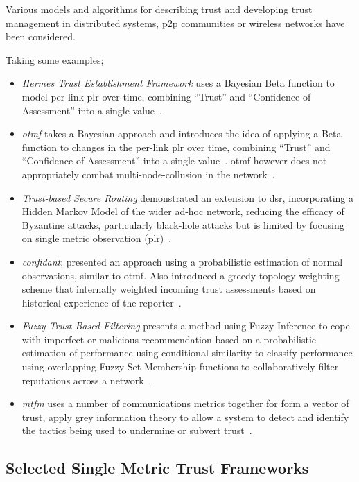\vspace{\baselineskip}

Various models and algorithms for describing trust and developing trust management in distributed systems, \gls{p2p} communities or wireless networks have been considered.

Taking some examples; %
%
\begin{itemize}
  \item \emph{Hermes Trust Establishment Framework} uses a Bayesian Beta function to model per-link \gls{plr} over time, combining ``Trust'' and ``Confidence of Assessment'' into a single value~\cite{Zouridaki2005}.
  \item \emph{\acrfull{otmf}} takes a Bayesian approach and introduces the idea of applying a Beta function to changes in the per-link \gls{plr} over time, combining ``Trust'' and ``Confidence of Assessment'' into a single value~\cite{Li2008}.
    \gls{otmf} however does not appropriately combat multi-node-collusion in the network~\cite{Cho2011}.
  \item \emph{Trust-based Secure Routing} demonstrated an extension to \gls{dsr}, incorporating a Hidden Markov Model of the wider ad-hoc network, reducing the efficacy of Byzantine attacks, particularly black-hole attacks but is limited by focusing on single metric observation (\gls{plr})~\cite{Moe2008a,Cho2011}.
  \item \emph{\gls{confidant}}; presented an approach using a probabilistic estimation of normal observations, similar to \gls{otmf}.
    Also introduced a greedy topology weighting scheme that internally weighted incoming trust assessments based on historical experience of the reporter~\cite{Buchegger2002}.
  \item \emph{Fuzzy Trust-Based Filtering} presents a method using Fuzzy Inference to cope with imperfect or malicious recommendation based on a probabilistic estimation of performance using conditional similarity to classify performance using overlapping Fuzzy Set Membership functions to collaboratively filter reputations across a network~\cite{Luo2008}.
  \item \emph{\acrfull{mtfm}} uses a number of communications metrics together for form a vector of trust, apply grey information theory to allow a system to detect and identify the tactics being used to undermine or subvert trust~\cite{Guo11}.
\end{itemize}
%

\subsection{Selected Single Metric Trust Frameworks}\label{sec:single_trust}

